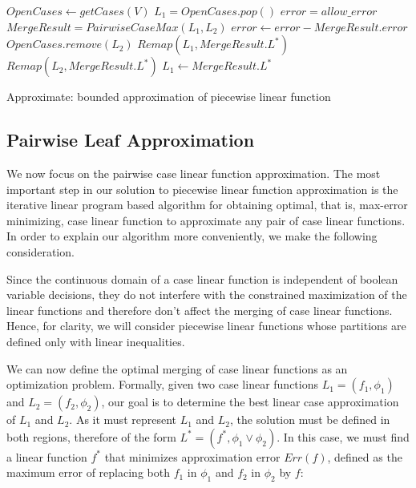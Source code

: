 \incmargin{1.5em}
\linesnumbered
\begin{algorithm}[!ht]
\dontprintsemicolon
{}
$OpenCases \gets getCases(V)$\;
 {
	$L_1 = OpenCases.pop()$\;
	$error = allow\_error$\;
	  { 
		$MergeResult = PairwiseCaseMax( L_1, L_2)$\;
		{
			$error \gets error - MergeResult.error$\;
			$OpenCases.remove(L_2)$\;
			$ Remap(L_1, MergeResult.L^*) $\;
			$ Remap(L_2, MergeResult.L^*) $\;
			$ L_1 \gets MergeResult.L^* $\;
		}
	}
}
\;
\caption{{\sc Approximate}: bounded approximation of piecewise linear function}
\label{alg:approx}
\end{algorithm}
\decmargin{1.5em}

\subsection{Pairwise Leaf Approximation}

We now focus on the pairwise case linear function approximation. The most important step in our solution to piecewise linear function approximation is the iterative linear program based algorithm for obtaining optimal, that is, max-error minimizing, case linear function to approximate any pair of case linear functions. In order to explain our algorithm more conveniently, we make the following consideration.

Since the continuous domain of a case linear function is independent of boolean variable decisions, they do not interfere with the constrained maximization of the linear functions and therefore don't affect the merging of case linear functions. Hence, for clarity, we will consider piecewise linear functions whose partitions are defined only with linear inequalities.

We can now define the optimal merging of case linear functions as an optimization problem. Formally, given two case linear functions $L_1 = ( f_1, \phi_1 )$ and $L_2 = ( f_2, \phi_2 )$, our goal is to determine the best linear case approximation of $L_1$ and $L_2$. As it must represent  $L_1$ and $L_2$, the solution must be defined in both regions, therefore of the form $L^* = (f^*,\phi_1 \lor  \phi_2)$. In this case, we must find a linear function $f^*$ that minimizes approximation error $Err(f)$, defined as the maximum  error of replacing both $f_1$ in $\phi_1$ and $f_2$ in $\phi_2$ by $f$:

